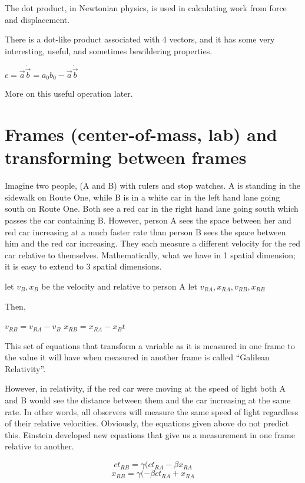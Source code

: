 The dot product, in Newtonian physics, is used in calculating work from force and displacement.

There is a dot-like product associated with 4 vectors, and it has some very interesting, useful, and sometimes bewildering properties.

	    \center  $c = \vec a \dot \vec b = a_0b_0 - \vec a \dot \vec b$

More on this useful operation later.

\section{Frames (center-of-mass, lab) and transforming between frames}

Imagine two people, (A and B) with rulers and stop watches.  A is standing in the sidewalk on Route One, while B is in a white car in the left hand lane going south on Route One.  Both see a red car in the right hand lane going south which passes the car containing B.  However, person A sees the space between her and red car increasing at a much faster rate than person B sees the space between him and the red car increasing.  They each measure a different velocity for the red car relative to themselves.  Mathematically, what we have in 1 spatial dimension; it is easy to extend to 3 spatial dimensions.

	 let $v_B, x_B$ be the velocity and relative to person A 
       let $v_{RA}, x_{RA},v_{RB}, x_{RB}$
	  

Then,
	  
	  $v_{RB} = v_{RA} - v_B$
        $x_{RB} = x_{RA} - x_B t$

This set of equations that transform a variable as it is measured in one frame to the value it will have when measured in another frame is called “Galilean Relativity”.

However, in relativity, if the red car were moving at the speed of light both A and B would see the distance between them and the car increasing at the same rate.  In other words, all observers will measure the same speed of light regardless of their relative velocities.  Obviously, the equations given above do not predict this.  Einstein developed new equations that give us a measurement in one frame relative to another.  


	\begin{equation} ct_{RB} = \gamma(ct_{RA} - \beta x_{RA} \end{equation} 
	\begin{equation}  x_{RB} = \gamma(- \beta ct_{RA} + x_{RA} 	 \end{equation} 

